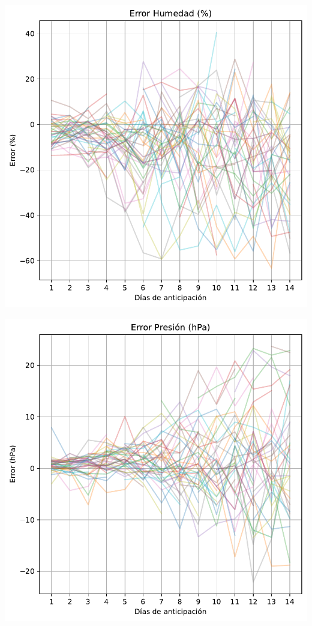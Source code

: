 \documentclass[
  10pt,
  a4paper,
  DIV=11,
  numbers=noendperiod,
  open=any]{scrreprt}
\makeatletter
\newcommand*\pandocbounded[1]{%
  \sbox\pandoc@box{#1}%
  \Gscale@div\@tempa{\textheight}{\dimexpr\ht\pandoc@box+\dp\pandoc@box\relax}%
  \Gscale@div\@tempb{\linewidth}{\wd\pandoc@box}%
  \ifdim\@tempb\p@<\@tempa\p@\let\@tempa\@tempb\fi%
  \ifdim\@tempa\p@<\p@\scalebox{\@tempa}{\usebox\pandoc@box}%
  \else\usebox{\pandoc@box}%
  \fi%
}
\numberwithin{equation}{chapter}
\numberwithin{equation}{section}
\renewcommand{\[}{\begin{equation}}
\renewcommand{\]}{\end{equation}}
\providecommand{\pandocbounded}[1]{#1}%
\renewcommand{\pandocbounded}[1]{\begingroup\centering #1\par\endgroup}
\makeatother
\begin{document}
\pandocbounded{\includegraphics[keepaspectratio]{03-meteorologia/predicciones_files/figure-pdf/cell-2-output-2.pdf}}

\pandocbounded{\includegraphics[keepaspectratio]{03-meteorologia/predicciones_files/figure-pdf/cell-2-output-3.pdf}}
\end{document}
